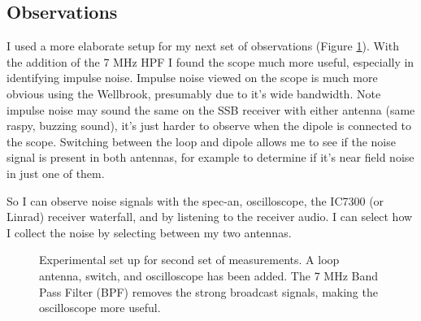 \documentclass{article}
\begin{document}
\subsection{Observations}

I used a more elaborate setup for my next set of observations (Figure \ref{fig:meas_config_2}).  With the addition of the 7 MHz HPF I found the scope much more useful, especially in identifying impulse noise.  Impulse noise viewed on the scope is much more obvious using the Wellbrook, presumably due to it's wide bandwidth. Note impulse noise may sound the same on the SSB receiver with either antenna (same raspy, buzzing sound), it's just harder to observe when the dipole is connected to the scope. Switching between the loop and dipole allows me to see if the noise signal is present in both antennas, for example to determine if it's near field noise in just one of them.

So I can observe noise signals with the spec-an, oscilloscope, the IC7300 (or Linrad) receiver waterfall, and by listening to the receiver audio.  I can select how I collect the noise by selecting between my two antennas.

\begin{figure}[h]
\caption{Experimental set up for second set of measurements.  A loop antenna, switch, and oscilloscope has been added. The 7 MHz Band Pass Filter (BPF) removes the strong broadcast signals, making the oscilloscope more useful.}
\label{fig:meas_config_2}
\begin{center}
\end{center}
\end{figure}
\end{document}
